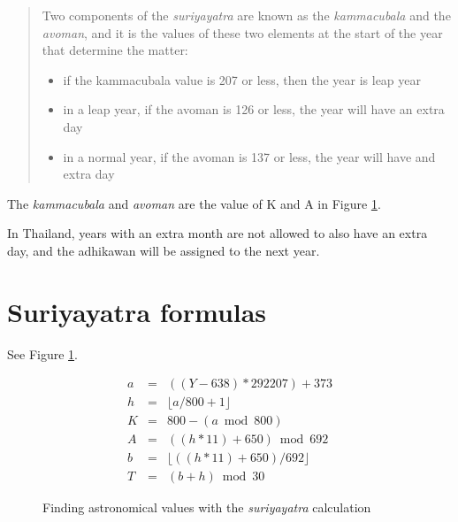 \documentclass[11pt,oneside]{memoir-article}
\begin{document}
\begin{quote}
Two components of the \emph{suriyayatra} are known as the \emph{kammacubala} and
the \emph{avoman}, and it is the values of these two elements at the start
of the year that determine the matter:

\begin{itemize}
\item if the kammacubala value is 207 or less, then the year is leap year
\item in a leap year, if the avoman is 126 or less, the year will have an
extra day
\item in a normal year, if the avoman is 137 or less, the year will have
and extra day\cite{eade-interpolation}
\end{itemize}
\end{quote}

The \emph{kammacubala} and \emph{avoman} are the value of K and A in Figure
\ref{fig-suriyayatra}.

In Thailand, years with an extra month are not allowed to also have an
extra day, and the adhikawan will be assigned to the next year.

\section{Suriyayatra formulas}
\label{sec-3-4}

See Figure \ref{fig-suriyayatra}.

\begin{figure}
\caption{\label{fig-suriyayatra}Finding astronomical values with the \emph{suriyayatra} calculation\cite{eade-interpolation}}
\begin{eqnarray}
a & = & ((Y - 638) * 292207) + 373 \\
h & = & \lfloor a/800 + 1 \rfloor \\
K & = & 800 - (a \bmod 800) \\
A & = & ((h*11) + 650) \bmod 692 \\
b & = & \lfloor ((h*11) + 650) / 692 \rfloor \\
T & = & (b + h) \bmod 30
\end{eqnarray}
\end{figure}
\end{document}
